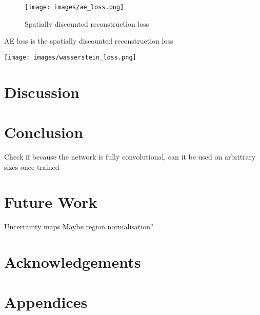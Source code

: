 \documentclass[twocolumn]{article}
\begin{document}
\begin{figure}[htbp]
\centering
\texttt{[image: images/ae\_loss.png]}
\caption{\label{fig:ae_loss}Spatially discounted reconstruction loss}
\end{figure}

AE loss is the spatially discounted reconstruction loss\autocite{zhangVoidFillingBased2020}

\begin{center}
\texttt{[image: images/wasserstein\_loss.png]}
\end{center}


\section{Discussion}
\label{sec:orgd71373b}

\section{Conclusion}
\label{sec:org916876d}
Check if because the network is fully convolutional, can it be used on arbritrary sizes once trained

\section{Future Work}
\label{sec:org6fe4ae7}

Uncertainty maps
Maybe region normalisation?\autocite{yuRegionNormalizationImage2023}

\section*{Acknowledgements}

\printbibliography

\section*{Appendices}
\end{document}

